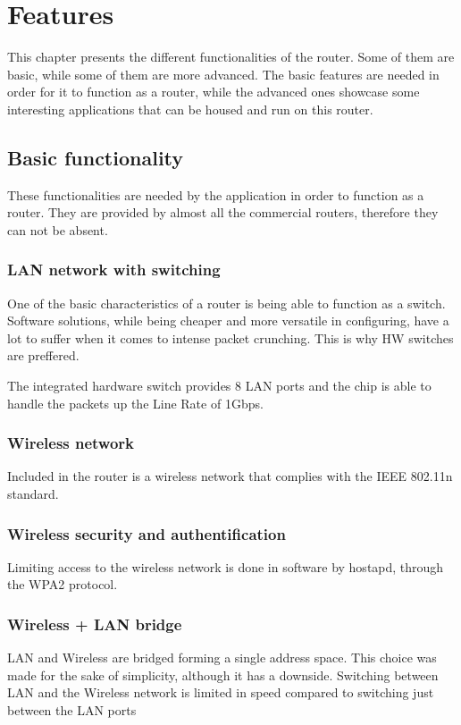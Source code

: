 \chapter{Features}
\label{chapter:features}

This chapter presents the different functionalities of the router.
Some of them are basic, while some of them are more advanced.
The basic features are needed in order for it to function as a router,
while the advanced ones showcase some interesting applications that
can be housed and run on this router.

\section{Basic functionality}
These functionalities are needed by the application in order to function
as a router. They are provided by almost all the commercial routers,
therefore they can not be absent.

\subsection{LAN network with switching}
\label{sub-sec:lan-switching}
One of the basic characteristics of a router is being able to function as
a switch. Software solutions, while being cheaper and more versatile
in configuring, have a lot to suffer when it comes to intense 
packet crunching. This is why HW switches are preffered.

The integrated hardware switch provides 8 LAN ports and the chip is able
to handle the packets up the Line Rate of 1Gbps.


\subsection{Wireless network}
\label{sub-sec:wireless}
Included in the router is a wireless network that complies with the
IEEE 802.11n standard.


\subsection{Wireless security and authentification}
\label{sub-sec:wireless-sec}
Limiting access to the wireless network is done in software by hostapd,
through the WPA2 protocol.

\subsection{Wireless + LAN bridge}
\label{sub-sec:bridging}
LAN and Wireless are bridged forming a single address space. This choice
was made for the sake of simplicity, although it has a downside. Switching
between LAN and the Wireless network is limited in speed compared 
to switching just between the LAN ports

